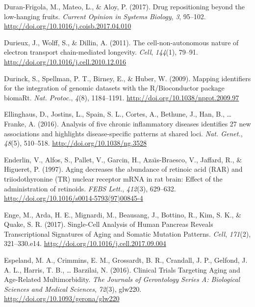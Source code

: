 \documentclass[12pt,twoside]{unicam}
\begin{document}
\begin{cslreferences}
\leavevmode\hypertarget{ref-Duran-Frigola2017}{}%
Duran-Frigola, M., Mateo, L., \& Aloy, P. (2017). Drug repositioning beyond the low-hanging fruits. \emph{Current Opinion in Systems Biology}, \emph{3}, 95--102. \url{http://doi.org/10.1016/j.coisb.2017.04.010}

\leavevmode\hypertarget{ref-Durieux2011}{}%
Durieux, J., Wolff, S., \& Dillin, A. (2011). The cell-non-autonomous nature of electron transport chain-mediated longevity. \emph{Cell}, \emph{144}(1), 79--91. \url{http://doi.org/10.1016/j.cell.2010.12.016}

\leavevmode\hypertarget{ref-Durinck2009}{}%
Durinck, S., Spellman, P. T., Birney, E., \& Huber, W. (2009). Mapping identifiers for the integration of genomic datasets with the R/Bioconductor package biomaRt. \emph{Nat. Protoc.}, \emph{4}(8), 1184--1191. \url{http://doi.org/10.1038/nprot.2009.97}

\leavevmode\hypertarget{ref-Ellinghaus2016}{}%
Ellinghaus, D., Jostins, L., Spain, S. L., Cortes, A., Bethune, J., Han, B., \ldots{} Franke, A. (2016). Analysis of five chronic inflammatory diseases identifies 27 new associations and highlights disease-specific patterns at shared loci. \emph{Nat. Genet.}, \emph{48}(5), 510--518. \url{http://doi.org/10.1038/ng.3528}

\leavevmode\hypertarget{ref-Enderlin1997}{}%
Enderlin, V., Alfos, S., Pallet, V., Garcin, H., Azaı̈s-Braesco, V., Jaffard, R., \& Higueret, P. (1997). Aging decreases the abundance of retinoic acid (RAR) and triiodothyronine (TR) nuclear receptor mRNA in rat brain: Effect of the administration of retinoids. \emph{FEBS Lett.}, \emph{412}(3), 629--632. \url{http://doi.org/10.1016/s0014-5793(97)00845-4}

\leavevmode\hypertarget{ref-Enge2017}{}%
Enge, M., Arda, H. E., Mignardi, M., Beausang, J., Bottino, R., Kim, S. K., \& Quake, S. R. (2017). Single-Cell Analysis of Human Pancreas Reveals Transcriptional Signatures of Aging and Somatic Mutation Patterns. \emph{Cell}, \emph{171}(2), 321--330.e14. \url{http://doi.org/10.1016/j.cell.2017.09.004}

\leavevmode\hypertarget{ref-Espeland2016}{}%
Espeland, M. A., Crimmins, E. M., Grossardt, B. R., Crandall, J. P., Gelfond, J. A. L., Harris, T. B., \ldots{} Barzilai, N. (2016). Clinical Trials Targeting Aging and Age-Related Multimorbidity. \emph{The Journals of Gerontology Series A: Biological Sciences and Medical Sciences}, \emph{72}(3), glw220. \url{http://doi.org/10.1093/gerona/glw220}


\end{cslreferences}
\end{document}
